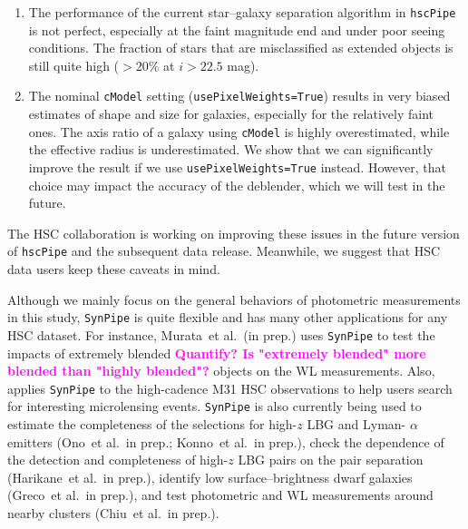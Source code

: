 \documentclass[useamsfonts]{pasj01}
\def\etal{{\ et al.~}}
\def\hscpipe{\texttt{hscPipe}}
\def\synpipe{\texttt{SynPipe}}
\def\cmodel{\texttt{cModel}}
\newcommand{\susan}[1]{\textcolor{magenta} {\textbf{#1}}}
\begin{document}
    \begin{enumerate}

        \item The performance of the current star--galaxy separation algorithm in \hscpipe{}
            is not perfect, especially at the faint magnitude end and under poor seeing
            conditions.
            The fraction of stars that are misclassified as extended objects is still
            quite high ($>20$\% at $i> 22.5$ mag).

        \item The nominal \cmodel{} setting  (\texttt{usePixelWeights=True}) results
            in very biased estimates of shape and size for galaxies, especially for the
            relatively faint ones.
            The axis ratio of a galaxy using \cmodel{} is highly overestimated, while
            the effective radius is underestimated.
            We show that we can significantly improve the result if we use \texttt{usePixelWeights=True} instead.
            However, that choice may impact the accuracy of the deblender, which we will test in the future.

    \end{enumerate}

    The HSC collaboration is working on improving these issues in the future version
    of \hscpipe{} and the subsequent data release.
    Meanwhile, we suggest that HSC data users keep these caveats in mind.

    Although we mainly focus on the general behaviors of photometric measurements in this study,
    \synpipe{} is quite flexible and has many other applications for any HSC
    dataset.
    For instance,  Murata\etal (in prep.) uses \synpipe{} to test
    the impacts of extremely blended \susan{Quantify? Is "extremely blended" more blended than "highly blended"?} objects on the WL measurements.
    Also, \citep{Niikura2017} applies \synpipe{} to the high-cadence M31 HSC observations
    to help users search for interesting microlensing events.
  \synpipe{} is also currently being used to estimate the completeness of the selections 
    for high-$z$ LBG and Lyman- $\alpha$ emitters 
    (Ono\etal in prep.; Konno\etal in prep.), check the dependence of the detection and 
    completeness of high-$z$ LBG pairs on the pair separation (Harikane\etal in prep.),
    identify low surface--brightness dwarf galaxies (Greco\etal in prep.),
    and test photometric and WL measurements around nearby clusters (Chiu\etal in prep.).
\end{document}
